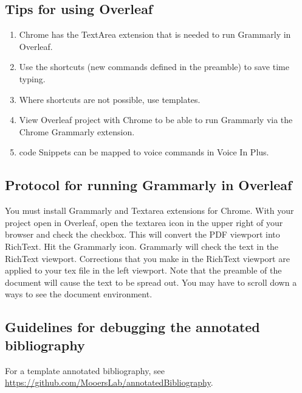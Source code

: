 \documentclass[11pt,letterpaper]{article}
\begin{document}
\subsection{Tips for using Overleaf}
\label{sec:orgacd22e6}

\begin{enumerate}
\item Chrome has the TextArea extension that is needed to run Grammarly in
Overleaf.
\item Use the shortcuts (new commands defined in the preamble) to save time
typing.
\item Where shortcuts are not possible, use templates.
\item View Overleaf project with Chrome to be able to run Grammarly via the
Chrome Grammarly extension.
\item code Snippets can be mapped to voice commands in Voice In Plus.
\end{enumerate}



\subsection{Protocol for running Grammarly in Overleaf}
\label{sec:org10f05e7}


You must install Grammarly and Textarea extensions for Chrome. With your
project open in Overleaf, open the textarea icon in the upper right of
your browser and check the checkbox. This will convert the PDF viewport
into RichText. Hit the Grammarly icon. Grammarly will check the text in
the RichText viewport. Corrections that you make in the RichText
viewport are applied to your tex file in the left viewport. Note that
the preamble of the document will cause the text to be spread out. You
may have to scroll down a ways to see the document environment.



\subsection{Guidelines for debugging the annotated bibliography}
\label{sec:org9c06645}



For a template annotated bibliography, see
\url{https://github.com/MooersLab/annotatedBibliography}.
\end{document}
